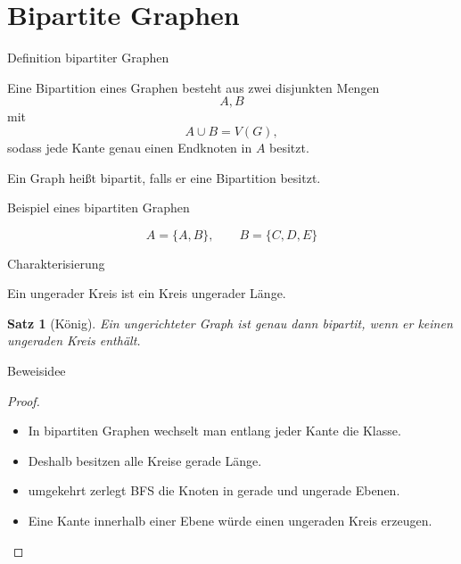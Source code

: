 \documentclass{beamer}
\newtheorem{satz}{Satz}
\begin{document}
\section{Bipartite Graphen}
\begin{frame}{Definition bipartiter Graphen}
\begin{definition}
Eine Bipartition eines Graphen besteht aus zwei disjunkten Mengen
\[A,B\]
mit
\[A\cup B=V(G),\]
sodass jede Kante genau einen Endknoten in \(A\) besitzt.
\end{definition}
\vspace{0.4cm}
Ein Graph heißt bipartit, falls er eine Bipartition besitzt.
\end{frame}
\begin{frame}{Beispiel eines bipartiten Graphen}
\begin{center}
\end{center}
\[A=\{A,B\},
\qquad
B=\{C,D,E\}\]
\end{frame}
\begin{frame}{Charakterisierung}
\begin{definition}
Ein ungerader Kreis ist ein Kreis ungerader Länge.
\end{definition}
\vspace{0.4cm}
\begin{satz}[König]
Ein ungerichteter Graph ist genau dann bipartit, wenn er keinen ungeraden Kreis enthält.
\end{satz}
\end{frame}
\begin{frame}{Beweisidee}
\begin{proof}
\begin{itemize}
    \item In bipartiten Graphen wechselt man entlang jeder Kante die Klasse.
    \item Deshalb besitzen alle Kreise gerade Länge.
    \item umgekehrt zerlegt BFS die Knoten in gerade und ungerade Ebenen.
    \item Eine Kante innerhalb einer Ebene würde einen ungeraden Kreis erzeugen.
\end{itemize}
\end{proof}
\end{frame}
\end{document}
